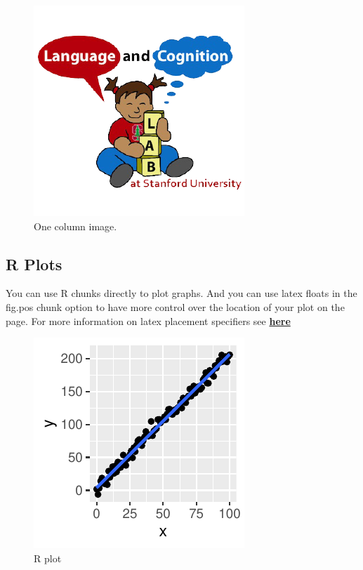 \documentclass[10pt, letterpaper]{article}
\newenvironment{CodeChunk}{}{}
\begin{document}
\begin{CodeChunk}
\begin{figure}[H]

{\centering \includegraphics{figs/image-1} 

}

\caption[One column image]{One column image.}\label{fig:image}
\end{figure}
\end{CodeChunk}

\hypertarget{r-plots}{%
\subsection{R Plots}\label{r-plots}}

You can use R chunks directly to plot graphs. And you can use latex
floats in the fig.pos chunk option to have more control over the
location of your plot on the page. For more information on latex
placement specifiers see
\textbf{\href{https://en.wikibooks.org/wiki/LaTeX/Floats,_Figures_and_Captions}{here}}

\begin{CodeChunk}
\begin{figure}[H]

{\centering \includegraphics{figs/plot-1} 

}

\caption[R plot]{R plot}\label{fig:plot}
\end{figure}
\end{CodeChunk}
\end{document}
